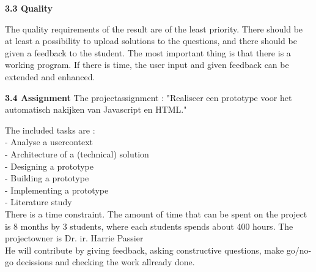 \documentclass{article}
\begin{document}
\noindent
\textbf{3.3 Quality}

\noindent
The quality requirements of the result are of the least priority. There should be at least a possibility to upload solutions to the questions, and there should be given a feedback to the student. The most important thing is that there is a working program. If there is time, the user input and given feedback can be extended and enhanced.
\newline

\noindent
\textbf{3.4 Assignment}
\newline
The projectassignment : "Realiseer een prototype voor het automatisch nakijken van Javascript en HTML."
\newline

The included tasks are :\\
- Analyse a usercontext\\
- Architecture of a (technical) solution\\
- Designing a prototype\\
- Building a prototype\\
- Implementing a prototype\\
- Literature study\\
\newline
There is a time constraint. The amount of time that can be spent on the project is 8 months by 3 students, where each students spends about 400 hours.
\newline
The projectowner is Dr. ir. Harrie Passier\\
He will contribute by giving feedback, asking constructive questions, make go/no-go decissions and checking the work allready done.
\newline
\end{document}
